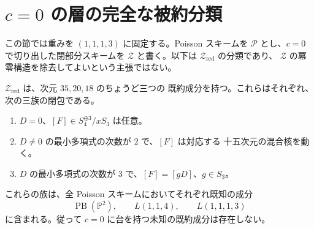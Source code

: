 \section{$c=0$ の層の完全な被約分類}
\label{sec:c-zero-v33}

この節では重みを $(1,1,1,3)$ に固定する。Poisson スキームを
$\mathcal P$ とし、$c=0$ で切り出した閉部分スキームを
$\mathcal Z$ と書く。以下は $\mathcal Z_{\mathrm{red}}$ の分類であり、
$\mathcal Z$ の冪零構造を除去してよいという主張ではない。

\begin{theorem}[零三次形式の層]
\label{thm:c-zero-v33}
$\mathcal Z_{\mathrm{red}}$ は、次元 $35,20,18$ のちょうど三つの
既約成分を持つ。これらはそれぞれ、次の三族の閉包である。
\begin{enumerate}
\item $D=0$、$[F]\in S_4^{\oplus3}/xS_3$ は任意。
\item $D\ne0$ の最小多項式の次数が $2$ で、$[F]$ は対応する
十五次元の混合核を動く。
\item $D$ の最小多項式の次数が $3$ で、$[F]=[gD]$、$g\in S_3$。
\end{enumerate}
これらの族は、全 Poisson スキームにおいてそれぞれ既知の成分
\[
 \operatorname{PB}(\mathbb P^2),\qquad
 L(1,1,4),\qquad L(1,1,1,3)
\]
に含まれる。従って $c=0$ に台を持つ未知の既約成分は存在しない。
\end{theorem}

